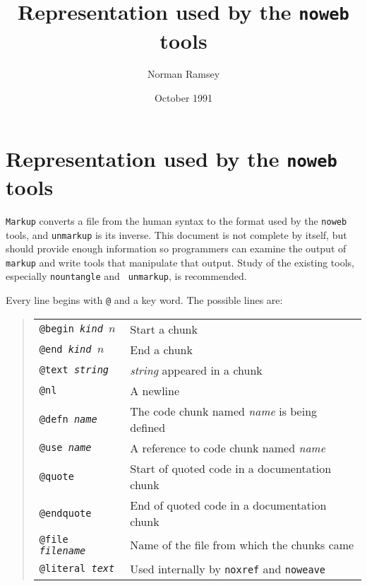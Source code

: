 \title{Representation used by the {\tt noweb} tools}
\author{Norman Ramsey}
\date{October 1991}
\setcounter{secnumdepth}{0}

\makeatletter
\def\refno#1{\nocite{#1}\@ifundefined
       {b@#1}{{\bf ?}\@warning
       {Reference number `#1' on page \thepage \space undefined}}%
{\hbox{\csname b@#1\endcsname}}}
\makeatother

\def\remark#1{\marginpar{\raggedright\hbadness=10000\footnotesize\it #1}}



\section{Representation used by the {\tt noweb} tools}

{\tt Markup} converts a file from the human syntax to the format used
by the {\tt noweb} tools, and
{\tt unmarkup} is its inverse.
This document is not  complete by itself, but should
 provide enough information so programmers can examine the
output of {\tt markup} and write tools that manipulate that output.
Study of the existing tools, especially {\tt nountangle} and {\tt
unmarkup}, is recommended.

Every line begins with {\tt @} and a key word.
The possible lines are:
\begin{quote}
\begin{tabular}{ll}
\tt @begin {\it kind} $n$&Start a chunk\\
\tt @end {\it kind} $n$&End a chunk\\
\tt @text {\it string}&{\it string} appeared in a chunk\\
\tt @nl&A newline\\
\tt @defn {\it name}&The code chunk named {\it name} is being defined\\
\tt @use {\it name}&A reference to code chunk named {\it name}\\
\tt @quote&Start of quoted code in a documentation chunk\\
\tt @endquote&End of quoted code in a documentation chunk\\
\tt @file {\it filename}&Name of the file from which the chunks came\\
\tt @literal {\it text}&Used internally by {\tt noxref} and {\tt noweave}\\
\end{tabular}
\end{quote}

